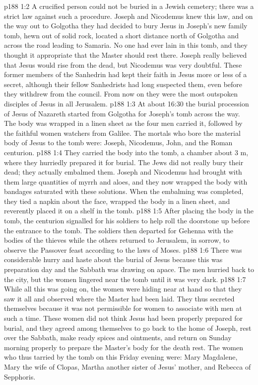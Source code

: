 \vs p188 1:2 A crucified person could not be buried in a Jewish cemetery; there was a strict law against such a procedure. Joseph and Nicodemus knew this law, and on the way out to Golgotha they had decided to bury Jesus in Joseph’s new family tomb, hewn out of solid rock, located a short distance north of Golgotha and across the road leading to Samaria. No one had ever lain in this tomb, and they thought it appropriate that the Master should rest there. Joseph really believed that Jesus would rise from the dead, but Nicodemus was very doubtful. These former members of the Sanhedrin had kept their faith in Jesus more or less of a secret, although their fellow Sanhedrists had long suspected them, even before they withdrew from the council. From now on they were the most outspoken disciples of Jesus in all Jerusalem.
\vs p188 1:3 At about 16:30 the burial procession of Jesus of Nazareth started from Golgotha for Joseph’s tomb across the way. The body was wrapped in a linen sheet as the four men carried it, followed by the faithful women watchers from Galilee. The mortals who bore the material body of Jesus to the tomb were: Joseph, Nicodemus, John, and the Roman centurion.
\vs p188 1:4 They carried the body into the tomb, a chamber about 3 m, where they hurriedly prepared it for burial. The Jews did not really bury their dead; they actually embalmed them. Joseph and Nicodemus had brought with them large quantities of myrrh and aloes, and they now wrapped the body with bandages saturated with these solutions. When the embalming was completed, they tied a napkin about the face, wrapped the body in a linen sheet, and reverently placed it on a shelf in the tomb.
\vs p188 1:5 After placing the body in the tomb, the centurion signalled for his soldiers to help roll the doorstone up before the entrance to the tomb. The soldiers then departed for Gehenna with the bodies of the thieves while the others returned to Jerusalem, in sorrow, to observe the Passover feast according to the laws of Moses.
\vs p188 1:6 There was considerable hurry and haste about the burial of Jesus because this was preparation day and the Sabbath was drawing on apace. The men hurried back to the city, but the women lingered near the tomb until it was very dark.
\vs p188 1:7 While all this was going on, the women were hiding near at hand so that they saw it all and observed where the Master had been laid. They thus secreted themselves because it was not permissible for women to associate with men at such a time. These women did not think Jesus had been properly prepared for burial, and they agreed among themselves to go back to the home of Joseph, rest over the Sabbath, make ready spices and ointments, and return on Sunday morning properly to prepare the Master’s body for the death rest. The women who thus tarried by the tomb on this Friday evening were: Mary Magdalene, Mary the wife of Clopas, Martha another sister of Jesus’ mother, and Rebecca of Sepphoris.
